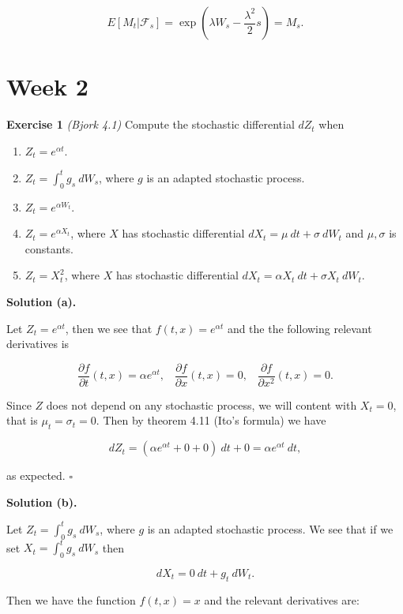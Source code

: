 \documentclass[a4paper,12pt,openany]{book}
\providecommand{\tightlist}{%
 \setlength{\itemsep}{0pt}\setlength{\parskip}{0pt}}
\begin{document}
\[
E[M_t\vert\mathcal{F}_s]=\exp\left(\lambda W_s-\frac{\lambda^2}{2}s\right)=M_s.
\]

\hypertarget{week-2}{%
\section{Week 2}\label{week-2}}

\textbf{Exercise 1} \emph{(Bjork 4.1)} Compute the stochastic differential \(dZ_t\) when

\begin{enumerate}
\def\labelenumi{\alph{enumi}.}
\tightlist
\item
  \(Z_t=e^{\alpha t}\).
\item
  \(Z_t=\int_0^t g_s\ dW_s\), where \(g\) is an adapted stochastic process.
\item
  \(Z_t=e^{\alpha W_t}\).
\item
  \(Z_t=e^{\alpha X_t}\), where \(X\) has stochastic differential \(dX_t=\mu\ dt + \sigma\ dW_t\) and \(\mu,\sigma\) is constants.
\item
  \(Z_t=X_t^2\), where \(X\) has stochastic differential \(dX_t=\alpha X_t\ dt+\sigma X_t\ dW_t\).
\end{enumerate}

\textbf{Solution (a).}

Let \(Z_t=e^{\alpha t}\), then we see that \(f(t,x)=e^{\alpha t}\) and the the following relevant derivatives is

\[
\frac{\partial f}{\partial t}(t,x)=\alpha e^{\alpha t},\hspace{10pt}\frac{\partial f}{\partial x}(t,x) =0,\hspace{10pt}\frac{\partial f}{\partial x^2}(t,x) =0.
\]

Since \(Z\) does not depend on any stochastic process, we will content with \(X_t=0\), that is \(\mu_t=\sigma_t=0\). Then by theorem 4.11 (Ito's formula) we have

\[
dZ_t=\left(\alpha e^{\alpha t} +0+0\right)\ dt + 0=\alpha e^{\alpha t}\ dt,
\]

as expected. \(\square\)

\textbf{Solution (b).}

Let \(Z_t=\int_0^t g_s\ dW_s\), where \(g\) is an adapted stochastic process. We see that if we set \(X_t=\int_0^t g_s\ dW_s\) then

\[
dX_t=0\ dt+g_t\ dW_t.
\]

Then we have the function \(f(t,x)=x\) and the relevant derivatives are:
\end{document}
